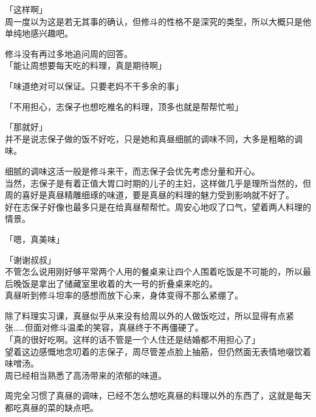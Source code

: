 「这样啊」\\

周一度以为这是若无其事的确认，但修斗的性格不是深究的类型，所以大概只是他单纯地感兴趣吧。

修斗没有再过多地追问周的回答。\\

「能让周想要每天吃的料理，真是期待啊」

「味道绝对可以保证。只要老妈不干多余的事」

「不用担心，志保子也想吃椎名的料理，顶多也就是帮帮忙啦」

「那就好」\\

并不是说志保子做的饭不好吃，只是她和真昼细腻的调味不同，大多是粗略的调味。

细腻的调味这活一般是修斗来干，而志保子会优先考虑分量和开心。\\

当然，志保子是有着正值大胃口时期的儿子的主妇，这样做几乎是理所当然的，但周的喜好是真昼精雕细琢的味道，要是真昼的料理的魅力受到影响就不好了。\\

好在志保子好像也最多只是在给真昼帮帮忙。周安心地叹了口气，望着两人料理的情景。\\

\vspace{2\baselineskip}

「嗯，真美味」

「谢谢叔叔」\\

不管怎么说用刚好够平常两个人用的餐桌来让四个人围着吃饭是不可能的，所以最后晚饭是拿出了储藏室里收着的大一号的折叠桌来吃的。\\

真昼听到修斗坦率的感想而放下心来，身体变得不那么紧绷了。

除了料理实习课，真昼似乎从来没有给周以外的人做饭吃过，所以显得有点紧张……但面对修斗温柔的笑容，真昼终于不再僵硬了。\\

「真的很好吃啊。这样的话不管是一个人住还是结婚都不用担心了」\\

望着这边感慨地念叨着的志保子，周尽管差点脸上抽筋，但仍然面无表情地啜饮着味噌汤。\\

周已经相当熟悉了高汤带来的浓郁的味道。

周完全习惯了真昼的调味，已经不怎么想吃真昼的料理以外的东西了，这就是每天都吃真昼的菜的缺点吧。\\

